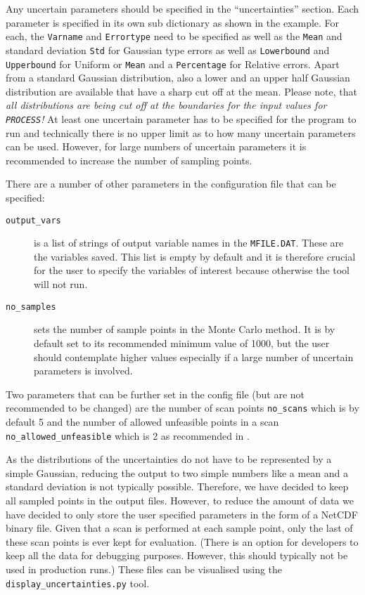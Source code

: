 \documentclass[11pt,a4paper]{article}
\newcommand{\mfile}{\mbox{\texttt{MFILE.DAT}}}
\newcommand{\process}{\mbox{\texttt{PROCESS}}}
\begin{document}
Any uncertain parameters should be specified in the ``uncertainties''
section. Each parameter is specified in its own sub dictionary as shown in the
example. For each, the \texttt{Varname} and \texttt{Errortype} need to be
specified as well as the \texttt{Mean} and standard deviation \texttt{Std} for
Gaussian type errors as well as \texttt{Lowerbound} and \texttt{Upperbound}
for Uniform or \texttt{Mean} and a \texttt{Percentage} for Relative errors. Apart from a standard Gaussian distribution, also a lower and an upper half Gaussian distribution are available that have a sharp cut off at the mean. Please note, that \emph{all distributions are being cut off at the boundaries for the input values for \process!}  At
least one uncertain parameter has to be specified for the program to run and
technically there is no upper limit as to how many uncertain parameters can be
used. However, for large numbers of uncertain parameters it is recommended to
increase the number of sampling points.

There are a number of other parameters in the configuration file that can be specified:
\begin{description}
\item[\texttt{output\_vars}] is a list of strings of output variable names in
  the \mfile. These are the variables saved. This list is empty by default and
  it is therefore crucial for the user to specify the variables of interest
  because otherwise the tool will not run.
\item[\texttt{no\_samples}] sets the number of sample points in the Monte
  Carlo method. It is by default set to its recommended minimum value of 1000,
  but the user should contemplate higher values especially if a large number
  of uncertain parameters is involved.
\end{description}
Two parameters that can be further set in the config file (but are not
recommended to be changed) are the number of scan points \texttt{no\_scans}
which is by default 5 and the number of allowed unfeasible points in a scan
\texttt{no\_allowed\_unfeasible} which is 2 as recommended in
\cite{WPPMI2014Report}.

As the distributions of the uncertainties do not have to be represented by a
simple Gaussian, reducing the output to two simple numbers like a mean and a
standard deviation is not typically possible. Therefore, we have decided to
keep all sampled points in the output files. However, to reduce the amount of
data we have decided to only store the user specified parameters in the form
of a NetCDF binary file. Given that a scan is performed at each sample point,
only the last of these scan points is ever kept for evaluation. (There is an
option for developers to keep all the data for debugging purposes. However,
this should typically not be used in production runs.) These files can be
visualised using the \texttt{display\_uncertainties.py} tool.
\end{document}
